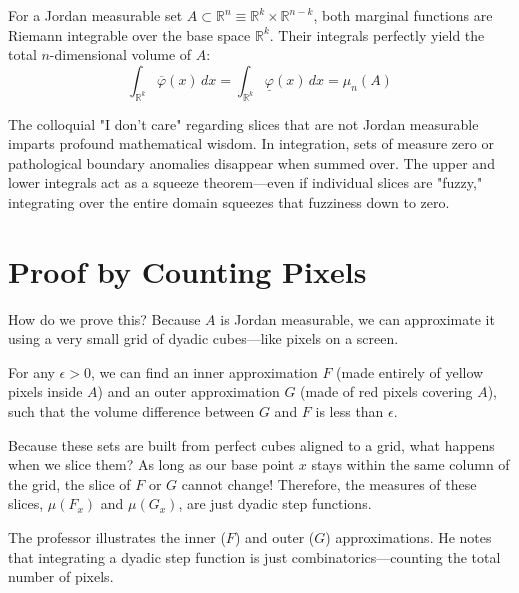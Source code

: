 \begin{orangeformula}
\begin{theorem}
For a Jordan measurable set $A \subset \mathbb{R}^n \equiv \mathbb{R}^k \times \mathbb{R}^{n-k}$, both marginal functions are Riemann integrable over the base space $\mathbb{R}^k$. Their integrals perfectly yield the total $n$-dimensional volume of $A$:
\[
\int_{\mathbb{R}^k} \overline{\varphi}(x) \, dx = \int_{\mathbb{R}^k} \underline{\varphi}(x) \, dx = \mu_n(A)
\]
\end{theorem}
\end{orangeformula}

\begin{didactic_insight}
The colloquial "I don't care" regarding slices that are not Jordan measurable imparts profound mathematical wisdom. In integration, sets of measure zero or pathological boundary anomalies disappear when summed over. The upper and lower integrals act as a squeeze theorem—even if individual slices are "fuzzy," integrating over the entire domain squeezes that fuzziness down to zero.
\end{didactic_insight}

\section{Proof by Counting Pixels}

\begin{spoken_clean}[00:46:30 - 00:52:00]
How do we prove this? Because $A$ is Jordan measurable, we can approximate it using a very small grid of dyadic cubes—like pixels on a screen. 

For any $\epsilon > 0$, we can find an inner approximation $F$ (made entirely of yellow pixels inside $A$) and an outer approximation $G$ (made of red pixels covering $A$), such that the volume difference between $G$ and $F$ is less than $\epsilon$.

Because these sets are built from perfect cubes aligned to a grid, what happens when we slice them? As long as our base point $x$ stays within the same column of the grid, the slice of $F$ or $G$ cannot change! Therefore, the measures of these slices, $\mu(F_x)$ and $\mu(G_x)$, are just dyadic step functions. 
\end{spoken_clean}

\begin{nice-box}
The professor illustrates the inner ($F$) and outer ($G$) approximations. He notes that integrating a dyadic step function is just combinatorics—counting the total number of pixels.
\end{nice-box}

